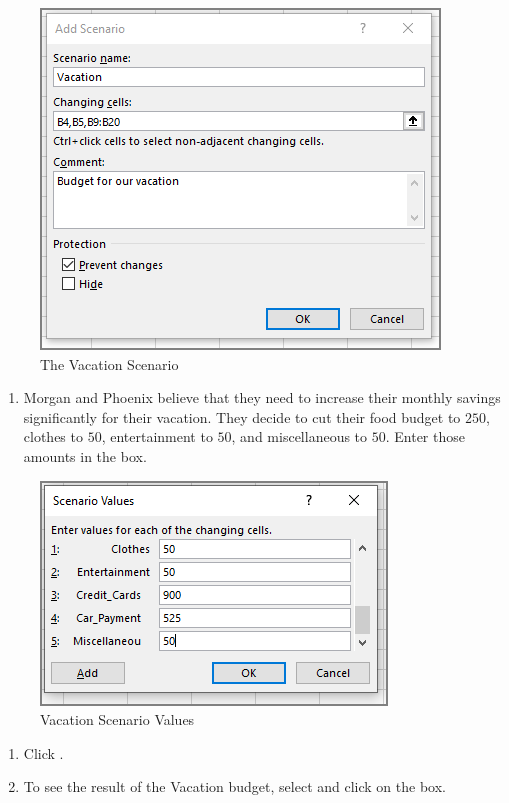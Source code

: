 \begin{figure}[H]
	\centering
	\includegraphics[width=\maxwidth{.95\linewidth}]{gfx/ch08_fig27}
	\caption{The Vacation Scenario}
	\label{08:fig27}
\end{figure}

\begin{enumerate}[resume]	
	
	\item Morgan and Phoenix believe that they need to increase their monthly savings significantly for their vacation. They decide to cut their food budget to $ 250 $, clothes to $ 50 $, entertainment to $ 50 $, and miscellaneous to $ 50 $. Enter those amounts in the  box.
	
\end{enumerate}

\begin{figure}[H]
	\centering
	\includegraphics[width=\maxwidth{.95\linewidth}]{gfx/ch08_fig28}
	\caption{Vacation Scenario Values}
	\label{08:fig28}
\end{figure}

\begin{enumerate}[resume]	
	
	\item Click .
	\item To see the result of the Vacation budget, select  and click  on the  box.
	
\end{enumerate}

